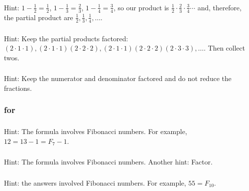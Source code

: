 \subsubsection*{ \answers}
Hint: $1 - \frac{1}{2} = \frac{1}{2}$, $1 - \frac{1}{3} = \frac{2}{3}$, $1 - \frac{1}{4} = \frac{3}{4}$, so our product is $ \frac{1}{2}\cdot \frac{2}{3} \cdot \frac{3}{4} \cdots $ and, therefore, the partial product are $\frac{1}{2}, \frac{1}{3}, \frac{1}{4}, \ldots$.

\subsubsection*{ \answers}
Hint: Keep the partial products factored: $(2\cdot 1 \cdot 1),(2\cdot 1 \cdot 1)(2\cdot 2 \cdot 2),(2\cdot 1 \cdot 1)(2\cdot 2 \cdot 2)(2\cdot 3 \cdot 3) , \ldots$.  Then collect twos.

\subsubsection*{ \answers}
Hint: Keep the numerator and denominator factored and do not reduce the fractions.

\subsubsection{\answers for  \subsumfib}

\subsubsection*{ \answers}
Hint: The formula involves Fibonacci numbers.  For example, $12 = 13-1 = F_7-1$.

\subsubsection*{ \answers}
Hint: The formula involves Fibonacci numbers. Another hint: Factor.

\subsubsection*{ \answers}
Hint: the answers involved Fibonacci numbers. For example, $55 = F_{10}$.







